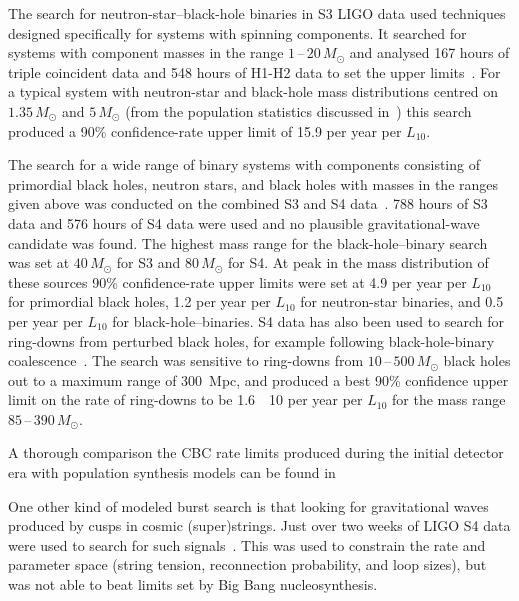 The search for neutron-star--black-hole binaries in S3 LIGO data used techniques
designed specifically for systems with spinning components. It searched for
systems with component masses in the range $1$\,--\,$20\,M_{\odot}$ and analysed 167
hours of triple coincident data and 548 hours of H1-H2 data to set the upper
limits~\cite{Abbott:2008d}. For a typical system with neutron-star and black-hole mass distributions centred on $1.35\,M_{\odot}$ and $5\,M_{\odot}$ (from
the population statistics discussed in~\cite{Abbott:2008a}) this search produced
a 90\% confidence-rate upper limit of 15.9 per year per $L_{10}$.


The search for a wide range of binary systems with components consisting of
primordial black holes, neutron stars, and black holes with masses in the ranges
given above was conducted on the combined S3 and S4 data~\cite{Abbott:2008a}.
788 hours of S3 data and 576 hours of S4 data were used and no plausible
gravitational-wave candidate was found. The highest mass range for the black-hole--binary search was set at $40\,M_{\odot}$ for S3 and $80\,M_{\odot}$ for S4. At peak in the
mass distribution of these sources 90\% confidence-rate upper limits were set at
4.9 per year per $L_{10}$ for primordial black holes, 1.2 per year per $L_{10}$
for neutron-star binaries, and 0.5 per year per $L_{10}$ for black-hole--binaries.
S4 data has also been used to search for ring-downs from perturbed black holes,
for example following black-hole-binary coalescence~\cite{Abbott:2009g}. The
search was sensitive to ring-downs from $10$\,--\,$500\,M_{\odot}$ black holes out to
a maximum range of 300~Mpc, and produced a best 90\% confidence upper limit on
the rate of ring-downs to be 1.6~\texttimes~10 per year per
$L_{10}$ for the mass range $85$\,--\,$390\,M_{\odot}$.

A thorough comparison the CBC rate limits produced during the initial detector era with population synthesis 
models can be found in \cite{2016ApJ...819..108B}


One other kind of modeled burst search is that looking for gravitational waves
produced by cusps in cosmic (super)strings. Just over two weeks of LIGO S4 data
were used to search for such signals~\cite{Abbott:2009j}. This was used to
constrain the rate and parameter space (string tension, reconnection
probability, and loop sizes), but was not able to beat limits set by Big Bang
nucleosynthesis.


